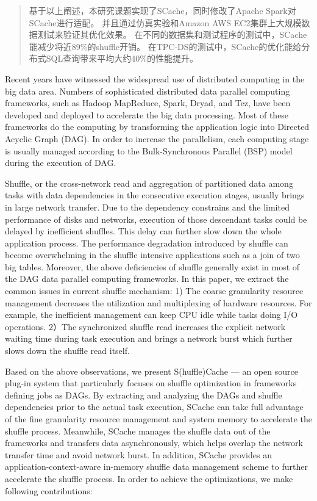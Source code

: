 \begin{abstract}
基于以上阐述，本研究课题实现了SCache，同时修改了Apache Spark对SCache进行适配。
并且通过仿真实验和Amazon AWS EC2集群上大规模数据测试来验证其优化效果。
在不同的数据集和测试程序的测试中，SCache能减少将近89\%的shuffle开销。
在TPC-DS的测试中，SCache的优化能给分布式SQL查询带来平均大约40\%的性能提升。

\end{abstract}

\begin{englishabstract}

Recent years have witnessed the widespread use of distributed computing in the big data area.
Numbers of sophisticated distributed data parallel computing frameworks, such as Hadoop MapReduce\cite{hadoop}, Spark\cite{spark}, Dryad\cite{dryad}, and Tez\cite{tez},
have been developed and deployed to accelerate the big data processing.
Most of these frameworks do the computing by transforming the application logic into Directed Acyclic Graph (DAG).
In order to increase the parallelism, each computing stage is usually managed according to the Bulk-Synchronous Parallel (BSP) model during the execution of DAG.

Shuffle, or the cross-network read and aggregation of partitioned data among tasks with data dependencies in the consecutive execution stages, 
usually brings in large network transfer. 
Due to the dependency constrains and the limited performance of disks and networks, execution of those descendant tasks could be delayed by inefficient shuffles. 
This delay can further slow down the whole application process. 
The performance degradation introduced by shuffle can become overwhelming in the shuffle intensive applications such as a join of two big tables.
Moreover, the above deficiencies of shuffle generally exist in most of the DAG data parallel computing frameworks. 
In this paper, we extract the common issues in current shuffle mechanism: 
1) The coarse granularity resource management decreases the utilization and multiplexing of hardware resources. For example, the inefficient management can keep CPU idle while tasks doing I/O operations.
2）The synchronized shuffle read increases the explicit network waiting time during task execution and brings a network burst which further slows down the shuffle read itself.

Based on the above observations, we present S(huffle)Cache --- an open source plug-in system that particularly focuses on shuffle optimization in frameworks defining jobs as DAGs. 
By extracting and analyzing the DAGs and shuffle dependencies prior to the actual task execution, 
SCache can take full advantage of the fine granularity resource management and system memory to accelerate the shuffle process. 
Meanwhile, SCache manages the shuffle data out of the frameworks and transfers data asynchronously, which helps overlap the network transfer time and avoid network burst.
In addition, SCache provides an application-context-aware in-memory shuffle data management scheme to further accelerate the shuffle process.  
In order to achieve the optimizations, we make following contributions:


\end{englishabstract}
